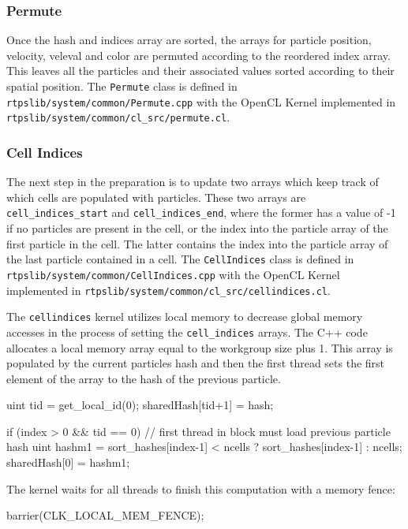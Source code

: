 \subsubsection{Permute}
Once the hash and indices array are sorted, the arrays for particle position,
velocity, veleval and color are permuted according to the reordered index
array. This leaves all the particles and their associated values sorted
according to their spatial position. The \verb|Permute| class is defined in
\verb|rtpslib/system/common/Permute.cpp| with the OpenCL Kernel implemented in
\verb|rtpslib/system/common/cl_src/permute.cl|.


\subsubsection{Cell Indices}
The next step in the preparation is to update two arrays which keep track of
which cells are populated with particles. These two arrays are
\verb|cell_indices_start| and \verb|cell_indices_end|, where the former has a
value of -1 if no particles are present in the cell, or the index into the
particle array of the first particle in the cell. The latter contains the index
into the particle array of the last particle contained in a cell.
The \verb|CellIndices| class is defined in
\verb|rtpslib/system/common/CellIndices.cpp| with the OpenCL Kernel implemented in
\verb|rtpslib/system/common/cl_src/cellindices.cl|.


The \verb|cellindices| kernel utilizes local memory to decrease global memory
accesses in the process of setting the \verb|cell_indices| arrays. 
The C++ code allocates a local memory array equal to the workgroup size plus 1.
This array is populated by the current particles hash and then the first thread
sets the first element of the array to the hash of the previous particle.
\begin{cppcode}{0}
uint tid = get_local_id(0);
sharedHash[tid+1] = hash; 

if (index > 0 && tid == 0)
{   
    // first thread in block must load previous particle hash
    uint hashm1 = sort_hashes[index-1] < ncells ? sort_hashes[index-1] : ncells;
    sharedHash[0] = hashm1;
}
\end{cppcode}

The kernel waits for all threads to finish this computation with a memory fence:
\begin{cppcode}{0}
barrier(CLK_LOCAL_MEM_FENCE);
\end{cppcode}


